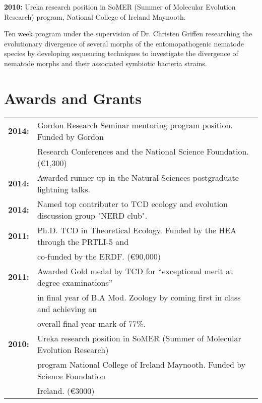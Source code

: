 \documentclass[10pt,a4paper]{article}
\begin{document}
\textbf{2010:} Ureka research position in SoMER (Summer of Molecular Evolution Research) program, National College of Ireland Maynooth.\\
\par{\fontsize{10.5}{10}\selectfont Ten week program under the supervision of Dr. Christen Griffen researching the evolutionary divergence of several morphs of the entomopathogenic nematode species by developing sequencing techniques to investigate the divergence of nematode morphs and their associated symbiotic bacteria strains.\bigskip}



\section{Awards and Grants}

\begin{tabular}{ll}
\textbf{2014:} & Gordon Research Seminar mentoring program position. Funded by Gordon\\
& Research Conferences and the National Science Foundation. (\euro 1,300)\\
\textbf{2014:} & Awarded runner up in the Natural Sciences postgraduate lightning talks. \\
\textbf{2014:} & Named top contributer to TCD ecology and evolution discussion group "NERD club".\\
\textbf{2011:} & Ph.D. TCD in Theoretical Ecology. Funded by the HEA through the PRTLI-5 and\\
& co-funded by the ERDF. (\euro 90,000)\\
\textbf{2011:} & Awarded Gold medal by TCD for “exceptional merit at degree examinations”\\
& in final year of B.A Mod. Zoology by coming first in class and achieving an\\
& overall final year mark of 77\%.\\
\textbf{2010:} & Ureka research position in SoMER (Summer of Molecular Evolution Research) \\
& program National College of Ireland Maynooth.  Funded by Science Foundation\\
& Ireland. (\euro 3000)\\ 
\end{tabular}

\bigskip
\end{document}
